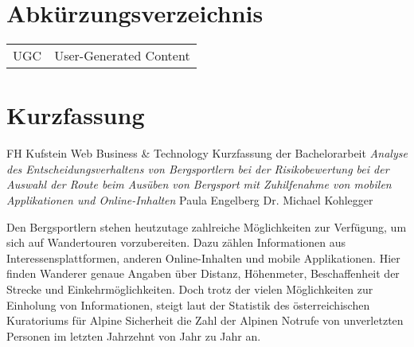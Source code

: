 
\chapter*{Abkürzungsverzeichnis}
\begin{table}[h]
	\label{my-label}
	\begin{tabular}{ll}
		UGC & User-Generated Content \\
	
	\end{tabular}
\end{table}

\chapter*{Kurzfassung}

FH Kufstein\newline
Web Business \& Technology\newline
Kurzfassung der Bachelorarbeit \textit{Analyse des Entscheidungsverhaltens von Bergsportlern bei der Risikobewertung bei der Auswahl der Route beim Ausüben von Bergsport mit Zuhilfenahme von mobilen Applikationen und Online-Inhalten}\newline
Paula Engelberg\newline
Dr. Michael Kohlegger


Den Bergsportlern stehen heutzutage zahlreiche Möglichkeiten zur Verfügung, um sich auf Wandertouren vorzubereiten. Dazu zählen Informationen  aus Interessensplattformen, anderen Online-Inhalten und mobile Applikationen. Hier finden Wanderer genaue Angaben über Distanz, Höhenmeter, Beschaffenheit der Strecke und Einkehrmöglichkeiten. Doch trotz der vielen Möglichkeiten zur Einholung von Informationen, steigt laut der Statistik des österreichischen Kuratoriums für Alpine Sicherheit die Zahl der Alpinen Notrufe von unverletzten Personen im letzten Jahrzehnt von Jahr zu Jahr an.

